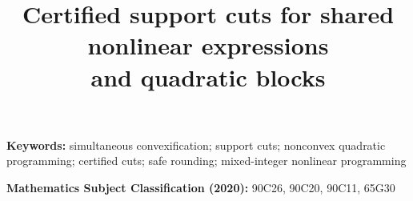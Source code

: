 \documentclass[11pt]{article}
\title{Certified support cuts for shared nonlinear expressions\\ and quadratic blocks}
\author{}
\date{}
\begin{document}
\maketitle


\noindent\textbf{Keywords:} simultaneous convexification; support cuts;
nonconvex quadratic programming; certified cuts; safe rounding;
mixed-integer nonlinear programming

\noindent\textbf{Mathematics Subject Classification (2020):} 90C26, 90C20,
90C11, 65G30















\appendix








\end{document}
